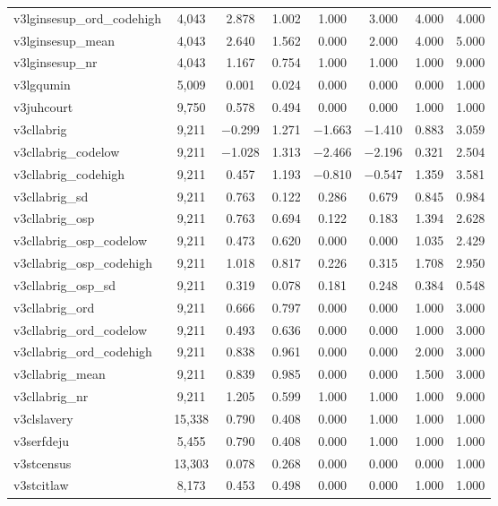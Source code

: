 \begin{table}[!htbp]
\begin{tabular}{@{\extracolsep{5pt}}lccccccc}
v3lginsesup\_ord\_codehigh & 4,043 & 2.878 & 1.002 & 1.000 & 3.000 & 4.000 & 4.000 \\ 
v3lginsesup\_mean & 4,043 & 2.640 & 1.562 & 0.000 & 2.000 & 4.000 & 5.000 \\ 
v3lginsesup\_nr & 4,043 & 1.167 & 0.754 & 1.000 & 1.000 & 1.000 & 9.000 \\ 
v3lgqumin & 5,009 & 0.001 & 0.024 & 0.000 & 0.000 & 0.000 & 1.000 \\ 
v3juhcourt & 9,750 & 0.578 & 0.494 & 0.000 & 0.000 & 1.000 & 1.000 \\ 
v3cllabrig & 9,211 & $-$0.299 & 1.271 & $-$1.663 & $-$1.410 & 0.883 & 3.059 \\ 
v3cllabrig\_codelow & 9,211 & $-$1.028 & 1.313 & $-$2.466 & $-$2.196 & 0.321 & 2.504 \\ 
v3cllabrig\_codehigh & 9,211 & 0.457 & 1.193 & $-$0.810 & $-$0.547 & 1.359 & 3.581 \\ 
v3cllabrig\_sd & 9,211 & 0.763 & 0.122 & 0.286 & 0.679 & 0.845 & 0.984 \\ 
v3cllabrig\_osp & 9,211 & 0.763 & 0.694 & 0.122 & 0.183 & 1.394 & 2.628 \\ 
v3cllabrig\_osp\_codelow & 9,211 & 0.473 & 0.620 & 0.000 & 0.000 & 1.035 & 2.429 \\ 
v3cllabrig\_osp\_codehigh & 9,211 & 1.018 & 0.817 & 0.226 & 0.315 & 1.708 & 2.950 \\ 
v3cllabrig\_osp\_sd & 9,211 & 0.319 & 0.078 & 0.181 & 0.248 & 0.384 & 0.548 \\ 
v3cllabrig\_ord & 9,211 & 0.666 & 0.797 & 0.000 & 0.000 & 1.000 & 3.000 \\ 
v3cllabrig\_ord\_codelow & 9,211 & 0.493 & 0.636 & 0.000 & 0.000 & 1.000 & 3.000 \\ 
v3cllabrig\_ord\_codehigh & 9,211 & 0.838 & 0.961 & 0.000 & 0.000 & 2.000 & 3.000 \\ 
v3cllabrig\_mean & 9,211 & 0.839 & 0.985 & 0.000 & 0.000 & 1.500 & 3.000 \\ 
v3cllabrig\_nr & 9,211 & 1.205 & 0.599 & 1.000 & 1.000 & 1.000 & 9.000 \\ 
v3clslavery & 15,338 & 0.790 & 0.408 & 0.000 & 1.000 & 1.000 & 1.000 \\ 
v3serfdeju & 5,455 & 0.790 & 0.408 & 0.000 & 1.000 & 1.000 & 1.000 \\ 
v3stcensus & 13,303 & 0.078 & 0.268 & 0.000 & 0.000 & 0.000 & 1.000 \\ 
v3stcitlaw & 8,173 & 0.453 & 0.498 & 0.000 & 0.000 & 1.000 & 1.000 \\ 

\end{tabular}
\end{table}
